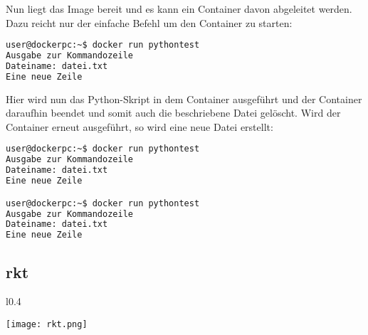 Nun liegt das Image bereit und es kann ein Container davon abgeleitet werden. Dazu reicht nur der einfache Befehl  um den Container zu starten:

\begin{lstlisting}[language=bash,label={code:dockerbuild}]
user@dockerpc:~$ docker run pythontest
Ausgabe zur Kommandozeile
Dateiname: datei.txt
Eine neue Zeile
\end{lstlisting}

Hier wird nun das Python-Skript in dem Container ausgeführt und der Container daraufhin beendet und somit auch die beschriebene Datei gelöscht. Wird der Container erneut ausgeführt, so wird eine neue Datei erstellt:

\begin{lstlisting}[language=bash,label={code:dockerbuild}]
user@dockerpc:~$ docker run pythontest
Ausgabe zur Kommandozeile
Dateiname: datei.txt
Eine neue Zeile

user@dockerpc:~$ docker run pythontest
Ausgabe zur Kommandozeile
Dateiname: datei.txt
Eine neue Zeile
\end{lstlisting}



\subsection*{rkt}
\label{sec:rkt}

\begin{wrapfigure}{l}{0.4\textwidth}
	\vspace{-40pt}
	\begin{center}
		\texttt{[image: rkt.png]}
	\end{center}
	\vspace{-15pt}
	\caption[Logo LXC]{ \footnotemark}
	\label{fig:rkt}
	\vspace{-30pt}
\end{wrapfigure}



